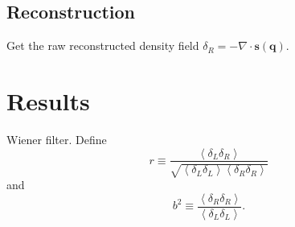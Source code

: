 \documentclass[aps,prd,twocolumn,superscriptaddress,amsfont,amssymb,amsmath,nofootinbib,showpacs,balancelastpage]{revtex4-1}
\newcommand{\bs}{\boldsymbol}
\begin{document}
\subsection{Reconstruction}
Get the raw reconstructed density field $\delta_R=-\nabla\cdot{\bs s}({\bs q})$.



\section{Results}\label{sec.results}

Wiener filter.
Define
\begin{equation}
    r\equiv \frac{\left\langle\delta_L\delta_R\right\rangle}
    {\sqrt{\left\langle\delta_L\delta_L\right\rangle
    \left\langle\delta_R\delta_R\right\rangle}}
\end{equation}
and
\begin{equation}
    b^2\equiv \frac{\left\langle\delta_R\delta_R\right\rangle}
    {\left\langle\delta_L\delta_L\right\rangle}.
\end{equation}
\end{document}
